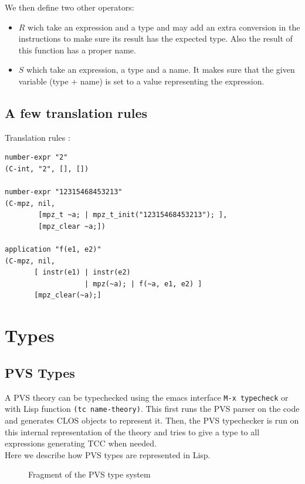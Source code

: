 \documentclass[12pt,a4paper,titlepage]{article}
\newcommand{\cl}[1]{\texttt{#1}}
\begin{document}
We then define two other operators:
\begin{itemize}
\item $R$ wich take an expression and a type and may add an extra conversion in the instructions to make sure its result has the expected type. Also the result of this function has a proper name.
\item $S$ which take an expression, a type and a name. It makes sure that the given variable (type + name) is set to a value representing the expression.
\end{itemize}




\subsection{A few translation rules}

Translation rules :




\begin{lstlisting}
number-expr "2"
(C-int, "2", [], [])

number-expr "12315468453213"
(C-mpz, nil,
        [mpz_t ~a; | mpz_t_init("12315468453213"); ],
        [mpz_clear ~a;])

application "f(e1, e2)"
(C-mpz, nil,
       [ instr(e1) | instr(e2)
                   | mpz(~a); | f(~a, e1, e2) ]
       [mpz_clear(~a);]
\end{lstlisting}



\section{Types}

\subsection{PVS Types}
A PVS theory can be typechecked using the emacs interface \cl{M-x typecheck} or with Lisp function \cl{(tc name-theory)}. This first runs the PVS parser on the code and generates CLOS objects to represent it. Then, the PVS typechecker is run on this internal representation of the theory and tries to give a type to all expressions generating TCC when needed.\\

Here we describe how PVS types are represented in Lisp.

\begin{figure}

\caption{Fragment of the PVS type system}
\end{figure}
\end{document}
